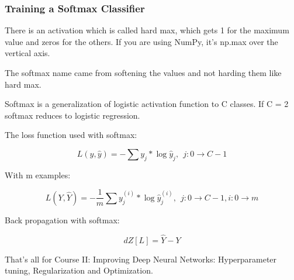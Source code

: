 \subsubsection{Training a Softmax Classifier}
There is an activation which is called hard max, which gets 1 for the maximum value and zeros for the others. If you are using NumPy, it's np.max over the vertical axis.

The softmax name came from softening the values and not harding them like hard max.

Softmax is a generalization of logistic activation function to C classes. If C = 2 softmax reduces to logistic regression.

The loss function used with softmax:

\begin{equation}
    L (y, \hat{y}) = - \sum y_j * \log \hat{y}_j,\ \ j: 0\to C-1
\end{equation}

With m examples:

\begin{equation}
    L (Y, \hat{Y}) = - \frac{1}{m} \sum y_j^{(i)} * \log \hat{y}_j^{(i)},\ \ j: 0\to C-1, i: 0\to m
\end{equation}

Back propagation with softmax:

\begin{equation}
    dZ[L] = \hat{Y} - Y
\end{equation}

That's all for Course II: Improving Deep Neural Networks: Hyperparameter tuning, Regularization and Optimization.

\newpage

